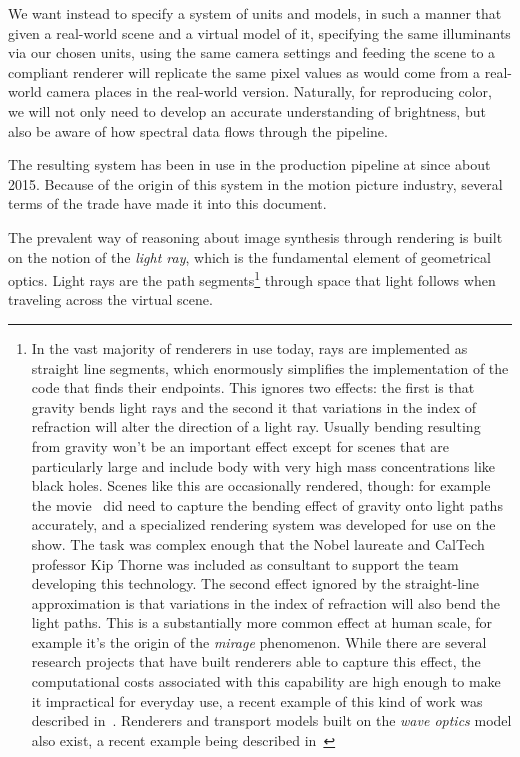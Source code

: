 We want instead to specify a system of units and models, in such a manner that
given a real-world scene and a virtual model of it,
specifying the same illuminants via our chosen units, using the same
camera settings and feeding the scene to a compliant renderer will replicate 
the same pixel values as would come from a real-world camera places in the 
real-world version. 
Naturally, for reproducing color, we will not only need
to develop an accurate understanding of brightness, but also be aware
of how \gls{spectral} data flows through the \gls{pipeline}.



The resulting system has been in use in the
production pipeline at  since about 2015.
Because of the origin of this system in the motion picture industry,
several terms of the trade have made it into this document. 


The prevalent way of reasoning about image synthesis through rendering is 
built on the notion of the \textsl{light ray}, which is the fundamental element 
of geometrical optics. 
Light rays are the path segments\footnote{
	In the vast majority of renderers in use today, rays are implemented as 
	straight line segments, which enormously simplifies the implementation of the
	code that finds their endpoints. This ignores two effects: the first is that 
	gravity bends light rays and the second it that variations in the index
	of refraction will alter the direction of a light ray.
	Usually bending resulting from gravity won't be an important effect except 
	for scenes that are particularly large and include body with very high mass 
	concentrations like black holes.
	Scenes like this are occasionally rendered, though: for example the 
	movie~\cite{interstellar2014} did need to capture the bending effect of 
	gravity onto light paths accurately, and a specialized rendering system 
	was developed for use on the show. 
	The task was complex enough that the Nobel laureate and CalTech professor 
	Kip Thorne was included as consultant to support the team developing this 
	technology. 
	The second effect ignored by the straight-line approximation is that 
	variations in the index of refraction will also bend the light paths. 
	This is a substantially more common effect at human scale, for example 
	it's the origin of the \textsl{mirage} phenomenon. 
	While there are several research projects that have built renderers able 
	to capture this effect, the computational costs associated with this capability 
	are high enough to make it impractical for everyday use, a recent example
	of this kind of work was described in~\cite{fraboni23}.
	Renderers and transport models built on the \emph{wave optics} model also exist,
	a recent example being described in~\cite{yu23}
} through space that light follows when traveling across the \gls{virtual scene}. 

